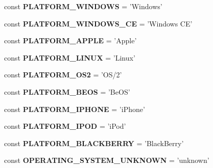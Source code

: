 \begin{DoxyCompactItemize}
\item 
\hypertarget{class_browser_a6f41c7e52b6bb1740b798ac0fe957b5f}{
const {\bfseries PLATFORM\_\-WINDOWS} = 'Windows'}
\label{class_browser_a6f41c7e52b6bb1740b798ac0fe957b5f}

\item 
\hypertarget{class_browser_ab4ce2f11dea3aa7f6260e1ac28bee3ed}{
const {\bfseries PLATFORM\_\-WINDOWS\_\-CE} = 'Windows CE'}
\label{class_browser_ab4ce2f11dea3aa7f6260e1ac28bee3ed}

\item 
\hypertarget{class_browser_a49ec8c03d273d9a4e8bca2302c7ddf7f}{
const {\bfseries PLATFORM\_\-APPLE} = 'Apple'}
\label{class_browser_a49ec8c03d273d9a4e8bca2302c7ddf7f}

\item 
\hypertarget{class_browser_adc992bcb16429e105ac2e442676af2f1}{
const {\bfseries PLATFORM\_\-LINUX} = 'Linux'}
\label{class_browser_adc992bcb16429e105ac2e442676af2f1}

\item 
\hypertarget{class_browser_a1c16f102f9f65c7324f9ed5467021dc6}{
const {\bfseries PLATFORM\_\-OS2} = 'OS/2'}
\label{class_browser_a1c16f102f9f65c7324f9ed5467021dc6}

\item 
\hypertarget{class_browser_a9ae5d1acbc51009895d796936157c45d}{
const {\bfseries PLATFORM\_\-BEOS} = 'BeOS'}
\label{class_browser_a9ae5d1acbc51009895d796936157c45d}

\item 
\hypertarget{class_browser_a7ec8aff8d8272991bb3c8b0b9fabd22b}{
const {\bfseries PLATFORM\_\-IPHONE} = 'iPhone'}
\label{class_browser_a7ec8aff8d8272991bb3c8b0b9fabd22b}

\item 
\hypertarget{class_browser_aac9b695c5bf275d24e047ef411078e82}{
const {\bfseries PLATFORM\_\-IPOD} = 'iPod'}
\label{class_browser_aac9b695c5bf275d24e047ef411078e82}

\item 
\hypertarget{class_browser_a23d86d61c121f695f03f7966cdc3611f}{
const {\bfseries PLATFORM\_\-BLACKBERRY} = 'BlackBerry'}
\label{class_browser_a23d86d61c121f695f03f7966cdc3611f}

\item 
\hypertarget{class_browser_a04c789f4ff62d69382e6f19179b60aa7}{
const {\bfseries OPERATING\_\-SYSTEM\_\-UNKNOWN} = 'unknown'}
\label{class_browser_a04c789f4ff62d69382e6f19179b60aa7}

\end{DoxyCompactItemize}
